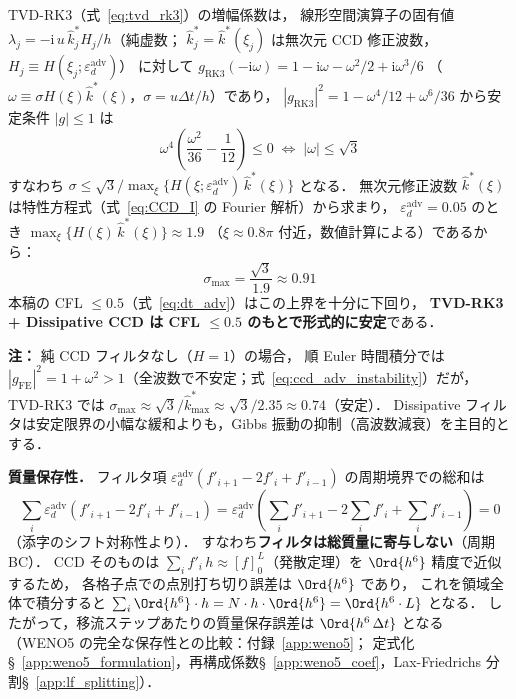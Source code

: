 \begin{tcolorbox}[resultbox, title={TVD-RK3 + Dissipative CCD の安定性上界（形式的導出）}]
\label{result:dccd_stability}
TVD-RK3（式~\eqref{eq:tvd_rk3}）の増幅係数は，
線形空間演算子の固有値 $\lambda_j = -\mathrm{i}\,u\,\hat{k}^*_j H_j/h$（純虚数；
$\hat{k}^*_j = \hat{k}^*(\xi_j)$ は無次元 CCD 修正波数，$H_j \equiv H(\xi_j;\varepsilon_d^{\mathrm{adv}})$）
に対して $g_{\mathrm{RK3}}(-\mathrm{i}\omega) = 1-\mathrm{i}\omega - \omega^2/2 + \mathrm{i}\omega^3/6$
（$\omega \equiv \sigma H(\xi)\hat{k}^*(\xi)$，$\sigma=u\Delta t/h$）であり，
$|g_{\mathrm{RK3}}|^2 = 1 - \omega^4/12 + \omega^6/36$
から安定条件 $|g| \leq 1$ は
\begin{equation}
  \omega^4\!\left(\frac{\omega^2}{36} - \frac{1}{12}\right) \leq 0
  \;\Longleftrightarrow\;
  |\omega| \leq \sqrt{3}
  \label{eq:rk3_stability_condition}
\end{equation}
すなわち $\sigma \leq \sqrt{3}/\max_\xi\bigl\{H(\xi;\varepsilon_d^{\mathrm{adv}})\,\hat{k}^*(\xi)\bigr\}$ となる．
無次元修正波数 $\hat{k}^*(\xi)$ は特性方程式（式~\eqref{eq:CCD_I} の Fourier 解析）から求まり，
$\varepsilon_d^{\mathrm{adv}} = 0.05$ のとき $\max_\xi\{H(\xi)\,\hat{k}^*(\xi)\} \approx 1.9$
（$\xi \approx 0.8\pi$ 付近，数値計算による）であるから：
\begin{equation}
  \sigma_{\max} = \frac{\sqrt{3}}{1.9} \approx 0.91
  \label{eq:cfl_upper_bound}
\end{equation}
本稿の CFL $\leq 0.5$（式~\eqref{eq:dt_adv}）はこの上界を十分に下回り，
\textbf{TVD-RK3 + Dissipative CCD は CFL $\leq 0.5$ のもとで形式的に安定}である．

\textbf{注：} 純 CCD フィルタなし（$H=1$）の場合，
順 Euler 時間積分では $|g_\text{FE}|^2 = 1+\omega^2 > 1$（全波数で不安定；式~\eqref{eq:ccd_adv_instability}）だが，
TVD-RK3 では $\sigma_{\max} \approx \sqrt{3}/\hat{k}^*_{\max} \approx \sqrt{3}/2.35 \approx 0.74$（安定）．
Dissipative フィルタは安定限界の小幅な緩和よりも，Gibbs 振動の抑制（高波数減衰）を主目的とする．
\end{tcolorbox}

\medskip
\noindent\textbf{質量保存性．}
フィルタ項 $\varepsilon_d^{\mathrm{adv}}(f'_{i+1}-2f'_i+f'_{i-1})$ の周期境界での総和は
\[
  \sum_i \varepsilon_d^{\mathrm{adv}}\!\left(f'_{i+1} - 2f'_i + f'_{i-1}\right)
  = \varepsilon_d^{\mathrm{adv}}\!\left(\sum_i f'_{i+1} - 2\sum_i f'_i + \sum_i f'_{i-1}\right) = 0
\]
（添字のシフト対称性より）．
すなわち\textbf{フィルタは総質量に寄与しない}（周期 BC）．
CCD そのものは $\sum_i f'_i\,h \approx [f]_0^L$（発散定理）を $\Ord{h^6}$ 精度で近似するため，
各格子点での点別打ち切り誤差は $\Ord{h^6}$ であり，
これを領域全体で積分すると $\sum_i \Ord{h^6}\cdot h = N\cdot h \cdot \Ord{h^6} = \Ord{h^6 \cdot L}$ となる．
したがって，移流ステップあたりの質量保存誤差は $\Ord{h^6\,\Delta t}$ となる
（WENO5 の完全な保存性との比較：付録~\ref{app:weno5}；
定式化§~\ref{app:weno5_formulation}，再構成係数§~\ref{app:weno5_coef}，Lax-Friedrichs 分割§~\ref{app:lf_splitting}）．

